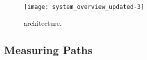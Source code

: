 



\begin{figure}[t!]
    \centering
        \texttt{[image: system\_overview\_updated-3]}
        \caption{\system{} architecture.}
        \label{fig:arch}
\end{figure}



\subsection{Measuring Paths}

